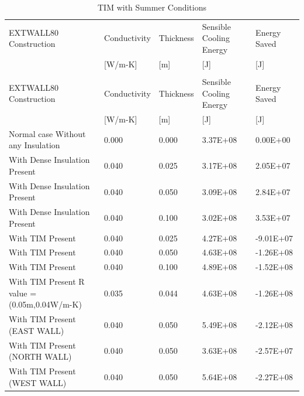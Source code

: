 {\scriptsize
\begin{longtable}[c]{p{2.5in}p{0.75in}p{0.75in}p{0.75in}p{0.75in}}
\caption{TIM with Summer Conditions \label{table:tim-with-summer-conditions-000}} \tabularnewline
\toprule
EXTWALL80 Construction & Conductivity & Thickness & Sensible Cooling Energy & Energy Saved \tabularnewline
~ & [W/m-K] & [m] & [J] & [J] \tabularnewline
\midrule
\endfirsthead

\caption[]{TIM with Summer Conditions} \tabularnewline
\toprule
EXTWALL80 Construction & Conductivity & Thickness & Sensible Cooling Energy & Energy Saved \tabularnewline
~ & [W/m-K] & [m] & [J] & [J] \tabularnewline
\midrule
\endhead

Normal case Without any Insulation & 0.000 & 0.000 & 3.37E+08 & 0.00E+00 \tabularnewline
With Dense Insulation Present & 0.040 & 0.025 & 3.17E+08 & 2.05E+07 \tabularnewline
With Dense Insulation Present & 0.040 & 0.050 & 3.09E+08 & 2.84E+07 \tabularnewline
With Dense Insulation Present & 0.040 & 0.100 & 3.02E+08 & 3.53E+07 \tabularnewline
With TIM Present & 0.040 & 0.025 & 4.27E+08 & -9.01E+07 \tabularnewline
With TIM Present & 0.040 & 0.050 & 4.63E+08 & -1.26E+08 \tabularnewline
With TIM Present & 0.040 & 0.100 & 4.89E+08 & -1.52E+08 \tabularnewline
With TIM Present R value = (0.05m,0.04W/m-K) & 0.035 & 0.044 & 4.63E+08 & -1.26E+08 \tabularnewline
With TIM Present (EAST WALL) & 0.040 & 0.050 & 5.49E+08 & -2.12E+08 \tabularnewline
With TIM Present (NORTH WALL) & 0.040 & 0.050 & 3.63E+08 & -2.57E+07 \tabularnewline
With TIM Present (WEST WALL) & 0.040 & 0.050 & 5.64E+08 & -2.27E+08 \tabularnewline
\bottomrule
\end{longtable}}

